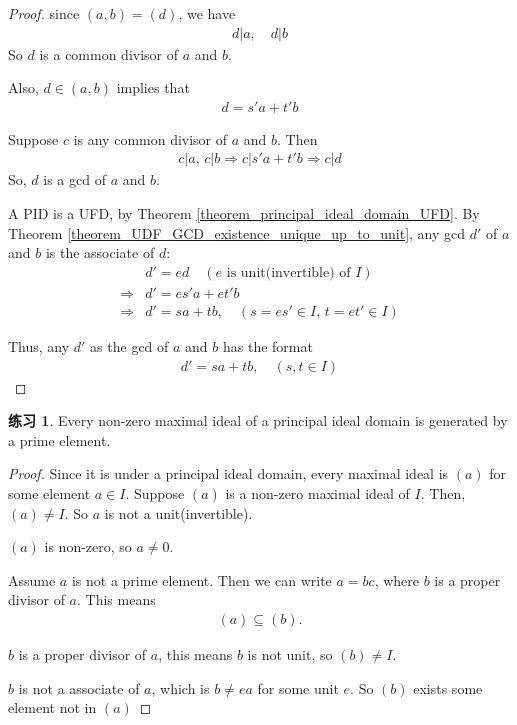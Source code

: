 \documentclass[utf8]{ctexbook}
\theoremstyle{definition}
\newtheorem{exercise}{练习}[section]
\begin{document}
\begin{proof}
since $(a,b)=(d)$, we have
\begin{align*}
d | a, \quad d | b
\end{align*}
So $d$ is a common divisor of $a$ and $b$.

Also, $d \in (a,b)$ implies that
\begin{align*}
d = s' a + t' b
\end{align*}

Suppose $c$ is any common divisor of $a$ and $b$. Then
\begin{align*}
c | a, \, c | b \Longrightarrow c|  s'a + t'b \Longrightarrow c | d
\end{align*}
So, $d$ is a gcd of $a$ and $b$.


A PID is a UFD, by Theorem \ref{theorem_principal_ideal_domain_UFD}. By Theorem \ref{theorem_UDF_GCD_existence_unique_up_to_unit}, any gcd $d'$ of $a$ and $b$ is the associate of $d$:
\begin{align*}
& d' = e d \quad (e \mbox{ is unit(invertible) of } I) \\
\Longrightarrow & d' = es' a + e t' b \\
\Longrightarrow & d' = s a + t b, \quad (s = e s' \in I, \, t = e t' \in I)
\end{align*}

Thus, any $d'$ as the gcd of $a$ and $b$ has the format
\begin{align*}
d' = s a + t b, \quad (s, t \in I)
\end{align*} 

\end{proof}


\begin{exercise}
Every non-zero maximal ideal of a principal ideal domain is generated by a prime element.
\end{exercise}

\begin{proof}
Since it is under a principal ideal domain, every maximal ideal is $(a)$ for some element $a \in I$. Suppose $(a)$ is a non-zero maximal ideal of $I$. Then, $(a) \neq I$. So $a$ is not a unit(invertible). 

$(a)$ is non-zero, so $a \neq 0$.

Assume $a$ is not a prime element. Then we can write $a= b c$, where $b$ is a proper divisor of $a$. This means
\begin{align*}
(a) \subseteq (b).
\end{align*}

$b$ is a proper divisor of $a$, this means $b$ is not unit, so $(b) \neq I$.

$b$ is not a associate of $a$, which is $b \neq e a $ for some unit $e$. So $(b)$ exists some element not in $(a)$

\end{proof}
\end{document}
